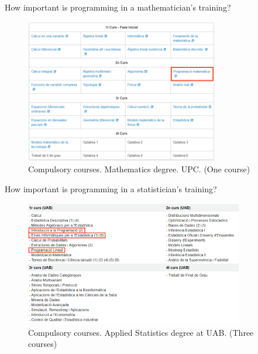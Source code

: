 \documentclass[ignorenonframetext,]{beamer}
\begin{document}
\begin{frame}{%
\protect\hypertarget{how-important-is-programming-in-a-mathematicians-training}{%
How important is programming in a mathematician’s training?}}

\begin{figure}
\includegraphics[width=0.75\textwidth]{"images/coursesMathematics"}
\caption{Compulsory courses. Mathematics degree. UPC. (One course)}
\end{figure}

\end{frame}

\begin{frame}{%
\protect\hypertarget{how-important-is-programming-in-a-statisticians-training}{%
How important is programming in a statistician’s training?}}

\begin{figure}
\includegraphics[width=0.85\textwidth]{"images/coursesAppliedStatsUAB"}
\caption{Compulsory courses. Applied Statistics degree at UAB. (Three courses)}
\end{figure}

\end{frame}
\end{document}

